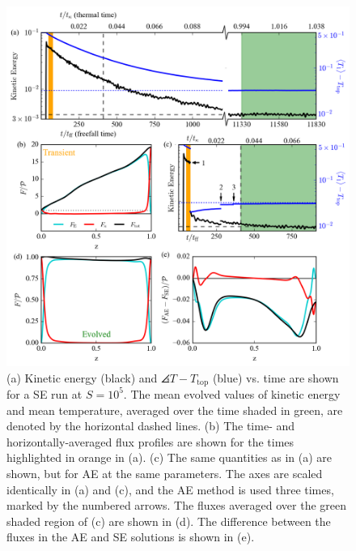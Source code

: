\begin{figure}[p!]
\includegraphics[width=\textwidth]{./figs/time_trace.png}
\caption{(a) Kinetic energy (black) and $\angles{T} - T_{\text{top}}$ (blue)  vs. time are shown
for a SE run at $S = 10^5$. The mean evolved values of kinetic energy and mean temperature,
averaged over the time shaded in green,
are denoted by the horizontal dashed lines. (b) The time- and horizontally-averaged
flux profiles are shown for the times highlighted in orange in (a).
(c) The same quantities as in (a) are shown, but for AE at the same parameters.
The axes are scaled identically in (a) and (c), and the AE method is used three times, marked by
the numbered arrows. The fluxes averaged over the green shaded region of (c)
are shown in (d). The difference between
the fluxes in the AE and SE solutions is shown in (e). \label{fig:time_trace} }
\end{figure}

